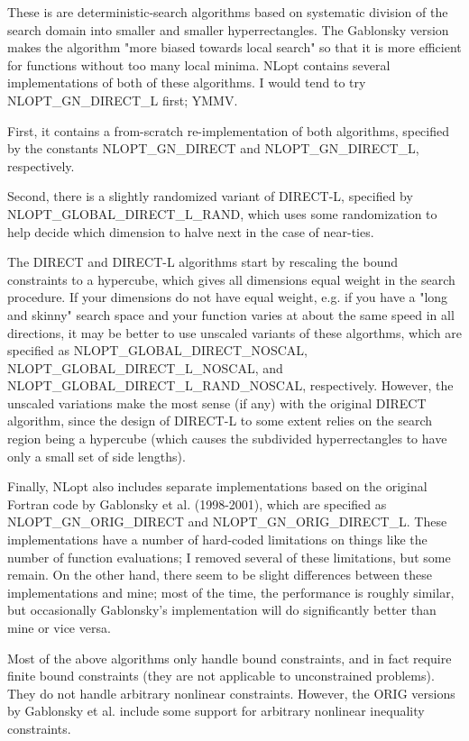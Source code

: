 These is are deterministic-search algorithms based on systematic division of the search domain into smaller and smaller hyperrectangles. The Gablonsky version makes the algorithm "more biased towards local search" so that it is more efficient for functions without too many local minima. NLopt contains several implementations of both of these algorithms. I would tend to try NLOPT\_GN\_DIRECT\_L first; YMMV. 

First, it contains a from-scratch re-implementation of both algorithms, specified by the constants NLOPT\_GN\_DIRECT and NLOPT\_GN\_DIRECT\_L, respectively. 

Second, there is a slightly randomized variant of DIRECT-L, specified by NLOPT\_GLOBAL\_DIRECT\_L\_RAND, which uses some randomization to help decide which dimension to halve next in the case of near-ties. 

The DIRECT and DIRECT-L algorithms start by rescaling the bound constraints to a hypercube, which gives all dimensions equal weight in the search procedure. If your dimensions do not have equal weight, e.g. if you have a "long and skinny" search space and your function varies at about the same speed in all directions, it may be better to use unscaled variants of these algorthms, which are specified as NLOPT\_GLOBAL\_DIRECT\_NOSCAL, NLOPT\_GLOBAL\_DIRECT\_L\_NOSCAL, and NLOPT\_GLOBAL\_DIRECT\_L\_RAND\_NOSCAL, respectively. However, the unscaled variations make the most sense (if any) with the original DIRECT algorithm, since the design of DIRECT-L to some extent relies on the search region being a hypercube (which causes the subdivided hyperrectangles to have only a small set of side lengths). 

Finally, NLopt also includes separate implementations based on the original Fortran code by Gablonsky et al. (1998-2001), which are specified as NLOPT\_GN\_ORIG\_DIRECT and NLOPT\_GN\_ORIG\_DIRECT\_L. These implementations have a number of hard-coded limitations on things like the number of function evaluations; I removed several of these limitations, but some remain. On the other hand, there seem to be slight differences between these implementations and mine; most of the time, the performance is roughly similar, but occasionally Gablonsky's implementation will do significantly better than mine or vice versa. 

Most of the above algorithms only handle bound constraints, and in fact require finite bound constraints (they are not applicable to unconstrained problems). They do not handle arbitrary nonlinear constraints. However, the ORIG versions by Gablonsky et al. include some support for arbitrary nonlinear inequality constraints. 



